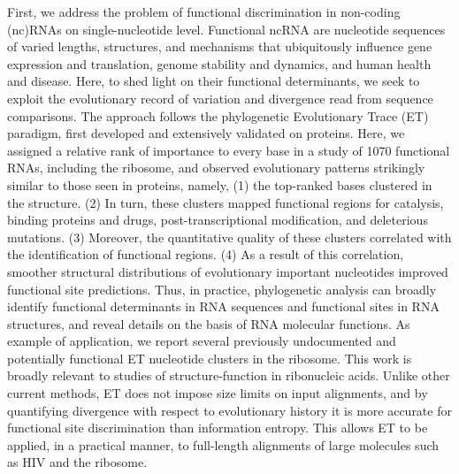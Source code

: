 \documentclass[12pt,a4paper]{report}
\begin{document}
First, we address the problem of functional discrimination in non-coding (nc)RNAs on single-nucleotide level. Functional ncRNA are nucleotide sequences of varied lengths, structures, and mechanisms that ubiquitously influence gene expression and translation, genome stability and dynamics, and human health and disease. Here, to shed light on their functional determinants, we seek to exploit the evolutionary record of variation and divergence read from sequence comparisons. The approach follows the phylogenetic Evolutionary Trace (ET) paradigm, first developed and extensively validated on proteins. Here, we assigned a relative rank of importance to every base in a study of 1070 functional RNAs, including the ribosome, and observed evolutionary patterns strikingly similar to those seen in proteins, namely, (1) the top-ranked bases clustered in the structure. (2) In turn, these clusters mapped functional regions for catalysis, binding proteins and drugs, post-transcriptional modification, and deleterious mutations. (3) Moreover, the quantitative quality of these clusters correlated with the identification of functional regions. (4) As a result of this correlation, smoother structural distributions of evolutionary important nucleotides improved functional site predictions. Thus, in practice, phylogenetic analysis can broadly identify functional determinants in RNA sequences and functional sites in RNA structures, and reveal details on the basis of RNA molecular functions. As example of application, we report several previously undocumented and potentially functional ET nucleotide clusters in the ribosome. This work is broadly relevant to studies of structure-function in ribonucleic acids. Unlike other current methods, ET does not impose size limits on input alignments, and by quantifying divergence with respect to evolutionary history it is more accurate for functional site discrimination than information entropy. This allows ET to be applied, in a practical manner, to full-length alignments of large molecules such as HIV and the ribosome. 
\end{document}

